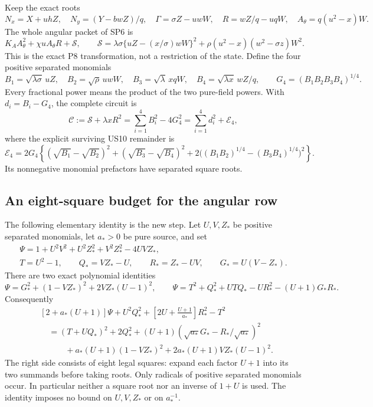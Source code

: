 Keep the exact roots
\[
 N_x=X+uhZ,\quad N_y=(Y-bwZ)/q,\quad
 \Gamma=\sigma Z-uwW,\quad R=wZ/q-uqW,
 \quad A_\theta=q(u^2-x)W.
 \tag{AR5}
\]
The whole angular packet of SP6 is
\[
 K_AA_\theta^2+\chi uA_\theta R+\mathscr S,
 \qquad
 \mathscr S=\lambda\sigma\{uZ-(x/\sigma)wW\}^2
       +\rho(u^2-x)(w^2-\sigma z)W^2.
 \tag{AR6}
\]
This is the exact P8 transformation, not a restriction of the state.
Define the four positive separated monomials
\[
 B_1=\sqrt{\lambda\sigma}\,uZ,\quad
 B_2=\sqrt\rho\,uwW,\quad
 B_3=\sqrt\lambda\,xqW,\quad
 B_4=\sqrt{\lambda x}\,wZ/q,
 \qquad G_4=(B_1B_2B_3B_4)^{1/4}.
 \tag{AR7}
\]
Every fractional power means the product of the two pure-field
powers. With $d_i=B_i-G_4$, the complete circuit is
\[
 \mathscr C:=\mathscr S+\lambda xR^2
       =\sum_{i=1}^4B_i^2-4G_4^2
       =\sum_{i=1}^4d_i^2+\mathcal E_4,
 \tag{AR8}
\]
where the explicit surviving US10 remainder is
\[
 \mathcal E_4=2G_4\left\{
 (\sqrt{B_1}-\sqrt{B_2})^2+
 (\sqrt{B_3}-\sqrt{B_4})^2+
 2\big((B_1B_2)^{1/4}-(B_3B_4)^{1/4}\big)^2\right\}.
 \tag{AR9}
\]
Its nonnegative monomial prefactors have separated square roots.

\subsection{An eight-square budget for the angular row}

The following elementary identity is the new step. Let $U,V,Z_*$
be positive separated monomials, let $a_*>0$ be pure source, and set
\[
 \begin{gathered}
 \Psi=1+U^2V^2+U^2Z_*^2+V^2Z_*^2-4UVZ_*,\\
 T=U^2-1,\qquad Q_*=VZ_*-U,\qquad
 R_*=Z_*-UV,\qquad G_*=U(V-Z_*).
 \end{gathered} \tag{AR10}
\]
There are two exact polynomial identities
\[
 \Psi=G_*^2+(1-VZ_*)^2+2VZ_*(U-1)^2,
 \qquad
 \Psi=T^2+Q_*^2+UTQ_*-UR_*^2-(U+1)G_*R_*.
 \tag{AR11}
\]
Consequently
\[
\boxed{\begin{aligned}
 &[2+a_*(U+1)]\Psi+U^2Q_*^2
       +\left[2U+\frac{U+1}{a_*}\right]R_*^2-T^2\\
 &\quad=(T+UQ_*)^2+2Q_*^2
       +(U+1)\left(\sqrt{a_*}G_*
                          -R_*/\sqrt{a_*}\right)^2\\
 &\qquad\quad+a_*(U+1)(1-VZ_*)^2
                     +2a_*(U+1)VZ_*(U-1)^2.
\end{aligned}} \tag{AR12}
\]
The right side consists of eight legal squares: expand each
factor $U+1$ into its two summands before taking roots. Only
radicals of positive separated monomials occur. In particular
neither a square root nor an inverse of $1+U$ is used. The
identity imposes no bound on $U,V,Z_*$ or on $a_*^{-1}$.

